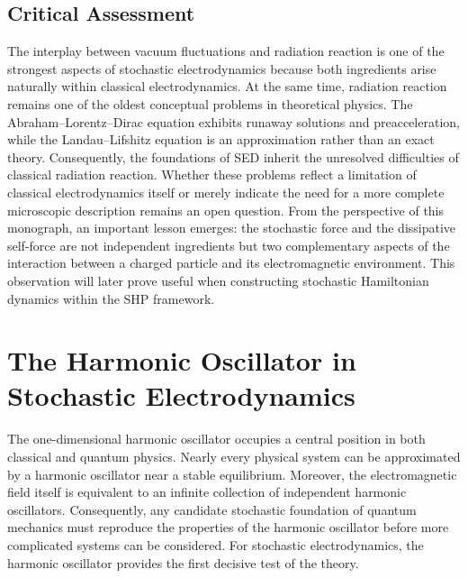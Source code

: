 \subsection*{Critical Assessment}
The interplay between vacuum fluctuations and radiation reaction is one
of the strongest aspects of stochastic electrodynamics because both
ingredients arise naturally within classical electrodynamics.
At the same time, radiation reaction remains one of the oldest
conceptual problems in theoretical physics. The Abraham--Lorentz--Dirac
equation exhibits runaway solutions and preacceleration, while the
Landau--Lifshitz equation is an approximation rather than an exact
theory.
Consequently, the foundations of SED inherit the unresolved difficulties
of classical radiation reaction. Whether these problems reflect a
limitation of classical electrodynamics itself or merely indicate the
need for a more complete microscopic description remains an open
question.
From the perspective of this monograph, an important lesson emerges:
the stochastic force and the dissipative self-force are not independent
ingredients but two complementary aspects of the interaction between a
charged particle and its electromagnetic environment. This observation
will later prove useful when constructing stochastic Hamiltonian
dynamics within the SHP framework.
\section{The Harmonic Oscillator in Stochastic Electrodynamics}
\label{sec:SEDOscillator}
The one-dimensional harmonic oscillator occupies a central position in
both classical and quantum physics. Nearly every physical system can be
approximated by a harmonic oscillator near a stable equilibrium.
Moreover, the electromagnetic field itself is equivalent to an infinite
collection of independent harmonic oscillators. Consequently, any
candidate stochastic foundation of quantum mechanics must reproduce the
properties of the harmonic oscillator before more complicated systems
can be considered.
For stochastic electrodynamics, the harmonic oscillator provides the
first decisive test of the theory.
